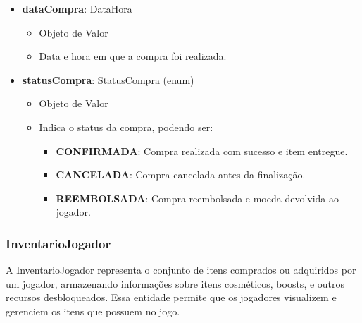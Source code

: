 \begin{itemize}
        \item \textbf{dataCompra}: DataHora  
              \begin{itemize}
                  \item Objeto de Valor
                  \item Data e hora em que a compra foi realizada.
              \end{itemize}
    
        \item \textbf{statusCompra}: StatusCompra (enum)  
              \begin{itemize}
                  \item Objeto de Valor
                  \item Indica o status da compra, podendo ser:
                  \begin{itemize}
                      \item \textbf{CONFIRMADA}: Compra realizada com sucesso e item entregue.
                      \item \textbf{CANCELADA}: Compra cancelada antes da finalização.
                      \item \textbf{REEMBOLSADA}: Compra reembolsada e moeda devolvida ao jogador.
                  \end{itemize}
              \end{itemize}
    \end{itemize}
    
    \subsubsection{InventarioJogador}
    A InventarioJogador representa o conjunto de itens comprados ou adquiridos por um jogador, armazenando informações sobre itens cosméticos, boosts, e outros recursos desbloqueados. Essa entidade permite que os jogadores visualizem e gerenciem os itens que possuem no jogo.

